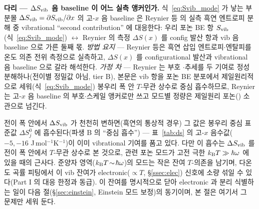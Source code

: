 \begin{srcbox}
\textbf{다리 --- $\Delta S_{\mathrm{vib}}$ 음 baseline 이 어느 실측 앵커인가.} 식~\eqref{eq:Svib_mode} 가 낳는 부분몰
$\Delta S_{\mathrm{vib}}=\partial S_{\mathrm{vib}}/\partial x$ 의 고-$x$ 음 baseline 은 Reynier 등\cite{reynier2003} 의 실측 흑연
엔트로피 분해 중 vibrational ``second contribution'' 에 대응한다: 우리 포논 BE 항 $S_{\mathrm{vib}}$(식~\eqref{eq:Svib_mode})
$\leftrightarrow$ Reynier 의 측정 $\Delta S(x)$ 를 config 발산 항과 vib 음 baseline 으로 가른 둘째 몫.
\emph{방법 요지} --- Reynier 등은 흑연 삽입 엔트로피$\cdot$엔탈피를 온도 의존 전위 측정으로 실측하고, $\Delta
S(x)$ 를 configurational 발산과 vibrational 음 baseline 으로 갈라 해석한다. \emph{가정 차} --- Reynier 는 부호
$\cdot$추세를 두 기여로 정성 분해하나(전이별 정밀값 아님, tier B), 본문은 vib 항을 포논 BE 분포에서
제일원리적으로 세워(식~\eqref{eq:Svib_mode}) 봉우리 폭 안 $T$-무관 상수로 중심 흡수하므로, Reynier 는 고-$x$
음 baseline 의 부호$\cdot$스케일 앵커로만 쓰고 모드별 정량은 제일원리 포논(\cite{jpcc2021}) 소관으로 넘긴다.
\end{srcbox}

전이 폭 안에서 $\Delta S_{\mathrm{vib}}$ 가 천천히 변하면(흑연의 통상적 경우) 그 값은 봉우리 중심 표준값 $\Delta S^0_j$
에 흡수된다(파생 B 의 ``중심 흡수'') --- 표~\ref{tab:ds} 의 고-$x$ 음수값($-5,-16$ J\,mol$^{-1}$K$^{-1}$)이
이미 vibrational 기여를 품고 있다. 다만 이 흡수는 $\Delta S_{\mathrm{vib}}$ 를 전이 폭 안에서 $T$-무관 상수로 본 것으로,
관련 포논 모드가 고전 극한 $k_{\mathrm B} T\gg\hbar\omega$ 에 있을 때의 근사다. 준양자 영역($k_{\mathrm B} T\!\sim\!\hbar\omega$)의
모드는 작은 잔여 $T$-의존을 남기며, 다온도 곡률 피팅에서 이 vib 잔여가 electronic($\propto T$,
\S\ref{ssec:elec}) 신호에 소량 섞일 수 있다(Part I 의 대응 한정과 동급). 이 잔여를 명시적으로 닫아
electronic 과 분리 식별하는 일이 다음 절(\S\ref{sec:einstein}, Einstein 모드 보정)의 동기이며, 본 절은 여기서
그 문제만 세워 둔다.

